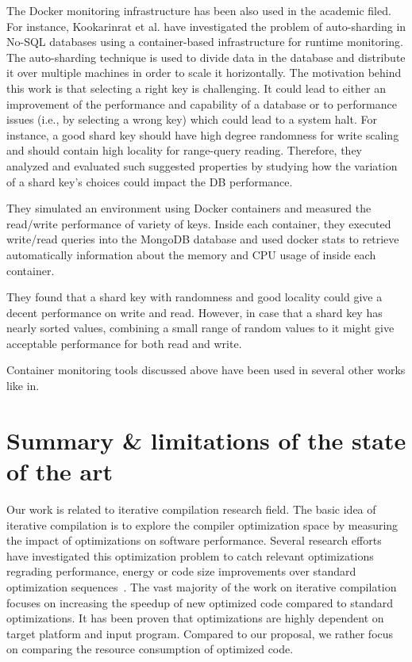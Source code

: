 The Docker monitoring infrastructure has been also used in the academic filed. For instance, \cite{kookarinrat2015analysis} Kookarinrat et al. have investigated the problem of auto-sharding in No-SQL databases using a container-based infrastructure for runtime monitoring. 
The auto-sharding technique is used to divide data in the database and distribute it over multiple machines in order to scale it horizontally. The motivation behind this work is that selecting a right key is challenging. It could lead to either an improvement of the performance and capability of a database or to performance issues (i.e., by selecting a wrong key) which could lead to a system halt. 
For instance, a good shard key should have high degree randomness for write scaling and should contain high locality for range-query reading.
Therefore, they analyzed and evaluated such suggested properties by studying how the variation of a shard key’s choices could impact the DB performance.

They simulated an environment using Docker containers and measured the read/write performance of variety of keys. Inside each container, they executed write/read queries into the MongoDB database and used docker stats to retrieve automatically information about the memory and CPU usage of inside each container.

They found that a shard key with randomness and good locality could give a decent performance on write and
read. However, in case that a shard key has nearly sorted values, combining a small range of random values to it might give acceptable performance for both read and write. 
 

Container monitoring tools discussed above have been used in several other works like in\cite{peinl2016docker,medel2016modelling}.
\section{Summary \& limitations of the state of the art}
\label{sec:suumary SOTA}
 



\iffalse
Our work is related to iterative compilation research field.
The basic idea of iterative compilation is to explore the compiler optimization space by measuring the impact of optimizations on software performance.
Several research efforts have investigated this optimization problem to catch relevant optimizations regrading performance, energy or code size improvements over standard optimization sequences~\cite{almagor2004finding,hoste2008cole,pan2006fast,zhong2009tuning,pallister2015identifying,chen2012deconstructing,sandran2012genetic,martins2014exploration,fursin2008milepost,lin2008automatic,schulte2014post}. 
The vast majority of the work on iterative compilation focuses on increasing the speedup of new optimized code compared to standard optimizations. 
It has been proven that optimizations are highly dependent on target platform and input program. Compared to our proposal, we rather focus on comparing the resource consumption of optimized code.

